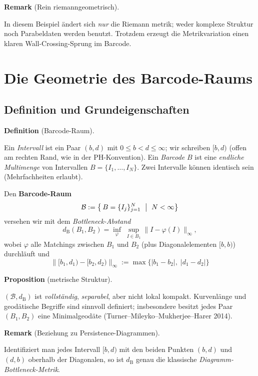 \documentclass[10pt, letterpaper]{article}
\newcommand{\CustomHeading}[3]{%
  \par\medskip\noindent%
  \textbf{#1 #2} \textnormal{(#3)}.\enskip%
}
\newenvironment{DEF}[2]{\CustomHeading{Definition}{#1}{#2}}{}
\newenvironment{PROP}[2]{\CustomHeading{Proposition}{#1}{#2}}{}
\newenvironment{REM}[2]{\CustomHeading{Remark}{#1}{#2}}{}
\begin{document}
\begin{REM}{}{Rein riemann­geometrisch}
  In diesem Beispiel ändert sich \emph{nur} die Riemann­
  metrik; weder komplexe Struktur noch
  Parabel­daten werden benutzt.
  Trotzdem erzeugt die Metrik­variation einen klaren
  Wall-Crossing-Sprung im Barcode.
\end{REM}


\section{Die Geometrie des Barcode-Raums}

\subsection{Definition und Grund­eigenschaften}

\begin{DEF}{}{Barcode-Raum}
  Ein \emph{Intervall} ist ein Paar $(b,d)$ mit
  $0\le b<d\le\infty$; wir schreiben $[b,d)$
  (offen am rechten Rand, wie in der PH-Konvention).
  Ein \emph{Barcode} $B$ ist eine \emph{endliche Multimenge}
  von Intervallen
  \(
    B=\bigl\{I_1,\dots,I_N\bigr\}.
  \)
  Zwei Intervalle können identisch sein (Mehrfach­heiten erlaubt).

  Den \textbf{Barcode-Raum}
  \[
    \mathcal{B}
      :=\bigl\{\,
            B=\{I_j\}_{j=1}^{N}
            \ \bigm|\ 
            N<\infty
          \bigr\}
  \]
  versehen wir mit dem \emph{Bottleneck-Abstand}
  \[
    d_{\mathrm B}(B_1,B_2)
       =\inf_{\varphi}
          \;\sup_{I\in B_1}
             \bigl\|I-\varphi(I)\bigr\|_\infty,
  \]
  wobei $\varphi$ alle Matchings zwischen $B_1$ und $B_2$
  (plus Diagonalelementen $[b,b)$) durchläuft und
  $$\bigl\| [b_1,d_1)-[b_2,d_2)\bigr\|_\infty
      :=\max\bigl\{|b_1-b_2|,\;|d_1-d_2|\bigr\}$$
\end{DEF}

\begin{PROP}{}{metrische Struktur}
  $(\mathcal{B},d_{\mathrm B})$ ist
  \emph{vollständig}, \emph{separabel}, aber nicht lokal kompakt.
  Kurvenlänge und geodätische Begriffe sind sinnvoll definiert;
  insbesondere besitzt jedes Paar $(B_1,B_2)$
  eine Minimalgeodäte (Turner–Mileyko–Mukherjee–Harer 2014).
\end{PROP}

\begin{REM}{}{Beziehung zu Persistence-Diagrammen}
  Identifiziert man jedes Intervall $[b,d)$ mit den beiden Punkten
  $(b,d)$ und $(d,b)$ oberhalb der Diagonalen,
  so ist $d_{\mathrm B}$ genau die klassische
  \emph{Diagramm-Bottleneck-Metrik}.
\end{REM}
\end{document}
